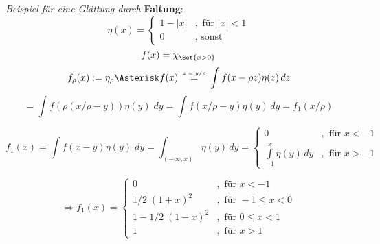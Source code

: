 \documentclass[11pt]{memoir}
\newcommand\overequal[1]{\mathrel{\overset{\makebox[0pt]{\mbox{\normalfont\tiny\sffamily $ #1 $}}}{=}}}
\begin{document}
\par\bigskip

\emph{Beispiel für eine Glättung durch} \textbf{Faltung}: \\
\begin{equation}
	\eta(x) = 
	\begin{cases}
		1- |x| & , \text{ für } |x| < 1 \\
		0  & , \text{ sonst}
	\end{cases}
\end{equation}
$$f(x) = \chi_{\Set{x > 0}}$$
$$f_\rho (x) := \eta_\rho \Asterisk f(x) \quad \overequal{z = y/ \rho} \quad \int f(x-\rho z) \eta (z) \, dz $$
$$= \int f(\rho(x/\rho - y)) \eta(y) \; dy = \int f (x/\rho -y) \eta(y) \, dy = f_1(x/\rho)$$

\begin{equation}
	f_1(x) = \int f(x-y) \eta (y) \;dy = \int_{(-\infty, x)} \eta (y) \,dy =
	\begin{cases}
		0 & ,\text{ für } x < -1 \\
		\int\limits_{-1}^x \eta(y) \, dy & ,\text{ für } x > -1
	\end{cases}
\end{equation}

\begin{equation}
	\Rightarrow
	f_1(x) = 
	\begin{cases}
		0 & ,\text{ für } x < -1 \\
		1/2\;(1+x)^2 & ,\text{ für }-1 \leq x < 0 \\
		1-1/2\;(1-x)^2 & , \text{ für } 0 \leq x < 1 \\
		1 & ,\text{ für } x > 1
	\end{cases}
\end{equation}
\end{document}
